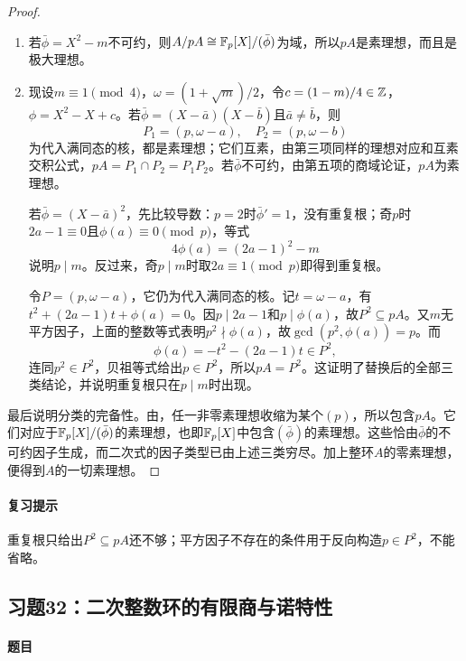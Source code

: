 \begin{proof}
\begin{enumerate}[label=(\roman*)]
\item 若$\bar\phi=X^2-m$不可约，则$A/pA\cong\mathbb F_p[X]/(\bar\phi)$为域，所以$pA$是素理想，而且是极大理想。

\item 现设$m\equiv1\pmod4$，$\omega=(1+\sqrt m)/2$，令$c=(1-m)/4\in\mathbb Z$，$\phi=X^2-X+c$。若$\bar\phi=(X-\bar a)(X-\bar b)$且$\bar a\ne\bar b$，则
\[
P_1=(p,\omega-a),\quad P_2=(p,\omega-b)
\]
为代入满同态的核，都是素理想；它们互素，由第三项同样的理想对应和互素交积公式，$pA=P_1\cap P_2=P_1P_2$。若$\bar\phi$不可约，由第五项的商域论证，$pA$为素理想。

若$\bar\phi=(X-\bar a)^2$，先比较导数：$p=2$时$\bar\phi'=1$，没有重复根；奇$p$时$2a-1\equiv0$且$\phi(a)\equiv0\pmod p$，等式
\[
4\phi(a)=(2a-1)^2-m
\]
说明$p\mid m$。反过来，奇$p\mid m$时取$2a\equiv1\pmod p$即得到重复根。

令$P=(p,\omega-a)$，它仍为代入满同态的核。记$t=\omega-a$，有$t^2+(2a-1)t+\phi(a)=0$。因$p\mid2a-1$和$p\mid\phi(a)$，故$P^2\subseteq pA$。又$m$无平方因子，上面的整数等式表明$p^2\nmid\phi(a)$，故$\gcd(p^2,\phi(a))=p$。而
\[
\phi(a)=-t^2-(2a-1)t\in P^2,
\]
连同$p^2\in P^2$，贝祖等式给出$p\in P^2$，所以$pA=P^2$。这证明了替换后的全部三类结论，并说明重复根只在$p\mid m$时出现。
\end{enumerate}

最后说明分类的完备性。由，任一非零素理想收缩为某个$(p)$，所以包含$pA$。它们对应于$\mathbb F_p[X]/(\bar\phi)$的素理想，也即$\mathbb F_p[X]$中包含$(\bar\phi)$的素理想。这些恰由$\bar\phi$的不可约因子生成，而二次式的因子类型已由上述三类穷尽。加上整环$A$的零素理想，便得到$A$的一切素理想。

\end{proof}

\paragraph{复习提示}

重复根只给出$P^2\subseteq pA$还不够；平方因子不存在的条件用于反向构造$p\in P^2$，不能省略。

\subsection{习题32：二次整数环的有限商与诺特性}

\label{ex:4:32}

\paragraph{题目}

